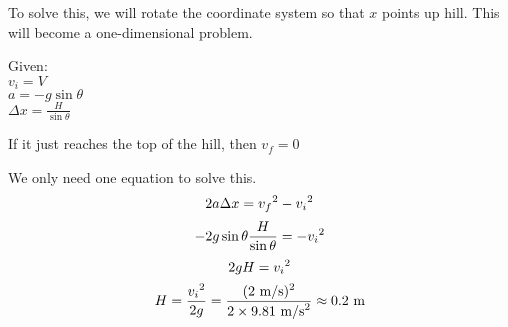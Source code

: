To solve this, we will rotate the coordinate system so that $x$ points up hill. This will become a one-dimensional problem.

Given:\\
$v_i=V$\\
$a=-g\sin\theta$\\
$\Delta{x}=\frac{H}{\sin\theta}$

If it just reaches the top of the hill, then $v_f=0$

We only need one equation to solve this.
$$2a\Delta{x}=v_f\displaystyle^2-v_i\displaystyle^2$$
$$-2g\sin\theta\frac{H}{\sin\theta}=-v_i\displaystyle^2$$
$$2gH=v_i\displaystyle^2$$
$$H=\frac{v_i\displaystyle^2}{2g}=\frac{(2\mbox{ m/s})\displaystyle^2}{2\times 9.81\mbox{ m/s}\displaystyle^2}\approx 0.2\mbox{ m}$$



\clearpage
